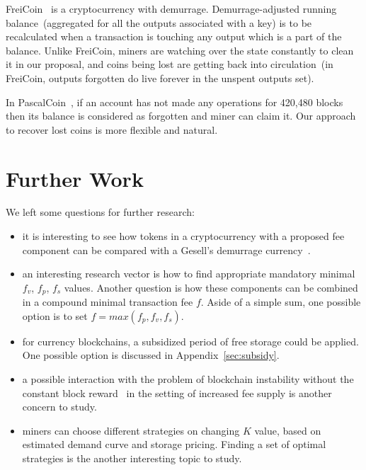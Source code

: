 \documentclass[]{llncs}   %
\begin{document}
FreiCoin~\cite{freicoin} is a cryptocurrency with demurrage. Demurrage-adjusted running balance~(aggregated for all the outputs associated with a key) is to be recalculated when a transaction is touching any output which is a part of the balance. Unlike FreiCoin, miners are watching over the state constantly to clean it in our proposal, and coins being lost are getting back into circulation~(in FreiCoin, outputs forgotten do live forever in the unspent outputs set).

In PascalCoin~\cite{pascalCoin}, if an account has not made any operations for 420,480 blocks then its balance is considered as forgotten and miner can claim it. Our approach to recover lost coins is more flexible and natural. 

\section{Further Work}
\label{sec:further-work}

We left some questions for further research:

\begin{itemize}
  \item{}it is interesting to see how tokens in a cryptocurrency with a proposed fee component can be compared with a Gesell's demurrage currency~\cite{gesell1958natural}.
  \item{}an interesting research vector is how to find appropriate mandatory minimal $f_v$, $f_p$, $f_s$ values. Another question is how these components can be combined in a compound minimal transaction fee $f$. Aside of a simple sum, one possible option is to set $f = max(f_p, f_v, f_s)$.
  \item{}for currency blockchains, a subsidized period of free storage could be applied. One possible option is discussed in Appendix~\ref{sec:subsidy}.
  \item{}a possible interaction with the problem of blockchain instability without the constant block reward~\cite{carlsten2016instability} in the setting of increased fee supply is another concern to study.
  \item{}miners can choose different strategies on changing $K$ value, based on estimated demand curve and storage pricing. Finding a set of optimal strategies is the another interesting topic to study. 
\end{itemize}




\appendix
\end{document}
